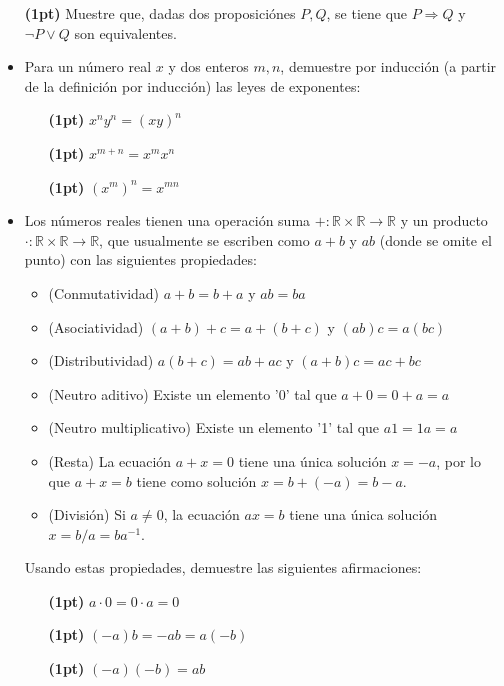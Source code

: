 \documentclass{article}
\newcommand{\R}{\mathbb{R}}
\begin{document}
\begin{itemize}
    \item[\bf (1pt)]  Muestre que, dadas dos proposiciónes $P, Q$, se tiene que $P\Rightarrow Q$ y $\neg P \vee Q$ son equivalentes. 
    \item Para un número real $x$ y dos enteros $m,n$, demuestre por inducción (a partir de la definición por inducción) las leyes de exponentes: 
        \begin{itemize}
            \item[\bf (1pt)] $x^ny^n = (xy)^n$
            \item[\bf (1pt)] $x^{m+n} = x^mx^n$
            \item[\bf (1pt)] $(x^m)^n = x^{mn}$
        \end{itemize}
    \item Los números reales tienen una operación suma $+:\R\times \R\to \R$ y un producto $\cdot: \R\times\R\to \R$, que usualmente se escriben como $a+b$ y $ab$ (donde se omite el punto)  con las siguientes propiedades:
        \begin{itemize}
            \item (Conmutatividad) $a+b=b+a$ y $ab=ba$
            \item (Asociatividad) $(a+b)+c = a+(b+c)$ y $(ab)c = a(bc)$
            \item (Distributividad) $a(b+c) = ab+ac$ y $(a+b)c = ac+bc$
            \item (Neutro aditivo) Existe un elemento '0' tal que $a+0 = 0+a = a$
            \item (Neutro multiplicativo) Existe un elemento '1' tal que $a1 = 1a = a$
            \item (Resta) La ecuación $a+x =0$ tiene una única solución $x=-a$, por lo que $a+x = b$ tiene como solución $x = b + (-a) = b-a$.
            \item (División) Si $a\neq 0$, la ecuación $ax=b$ tiene una única solución $x = b/a = ba^{-1}$. 
        \end{itemize}

        Usando estas propiedades, demuestre las siguientes afirmaciones: 
        \begin{itemize}
            \item[\bf (1pt)]  $a \cdot 0 = 0 \cdot a = 0$
            \item[\bf (1pt)] $(-a)b = -ab = a(-b)$
            \item[\bf (1pt)] $(-a)(-b) = ab$
        \end{itemize}


\end{itemize}
\end{document}
